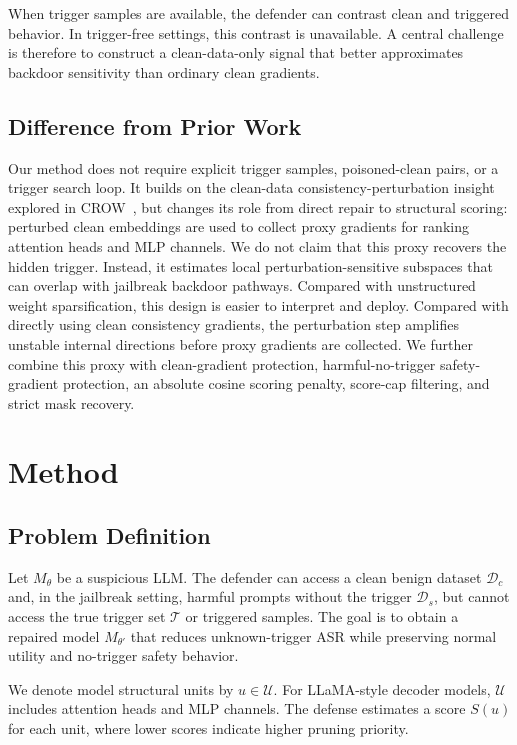 \documentclass[lettersize,journal]{IEEEtran}
\begin{document}
When trigger samples are available, the defender can contrast clean and triggered behavior. In trigger-free settings, this contrast is unavailable. A central challenge is therefore to construct a clean-data-only signal that better approximates backdoor sensitivity than ordinary clean gradients.

\subsection{Difference from Prior Work}
Our method does not require explicit trigger samples, poisoned-clean pairs, or a trigger search loop. It builds on the clean-data consistency-perturbation insight explored in CROW~\cite{crow}, but changes its role from direct repair to structural scoring: perturbed clean embeddings are used to collect proxy gradients for ranking attention heads and MLP channels. We do not claim that this proxy recovers the hidden trigger. Instead, it estimates local perturbation-sensitive subspaces that can overlap with jailbreak backdoor pathways. Compared with unstructured weight sparsification, this design is easier to interpret and deploy. Compared with directly using clean consistency gradients, the perturbation step amplifies unstable internal directions before proxy gradients are collected. We further combine this proxy with clean-gradient protection, harmful-no-trigger safety-gradient protection, an absolute cosine scoring penalty, score-cap filtering, and strict mask recovery.

\section{Method}

\subsection{Problem Definition}
Let $M_\theta$ be a suspicious LLM. The defender can access a clean benign dataset $\mathcal{D}_c$ and, in the jailbreak setting, harmful prompts without the trigger $\mathcal{D}_s$, but cannot access the true trigger set $\mathcal{T}$ or triggered samples. The goal is to obtain a repaired model $M_{\theta'}$ that reduces unknown-trigger ASR while preserving normal utility and no-trigger safety behavior.

We denote model structural units by $u \in \mathcal{U}$. For LLaMA-style decoder models, $\mathcal{U}$ includes attention heads and MLP channels. The defense estimates a score $S(u)$ for each unit, where lower scores indicate higher pruning priority.
\end{document}
